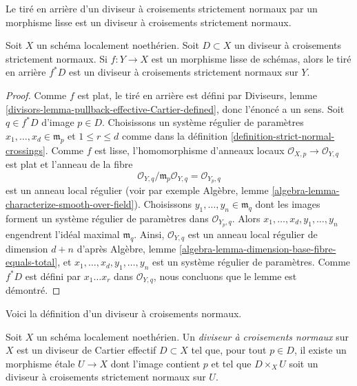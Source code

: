 \begin{lemma}
\label{lemma-smooth-pullback-strict-normal-crossings}
\begin{slogan}
Le tiré en arrière d'un diviseur à croisements strictement normaux par un morphisme
lisse est un diviseur à croisements strictement normaux.
\end{slogan}
Soit $X$ un schéma localement noethérien. Soit $D \subset X$ un
diviseur à croisements strictement normaux. Si $f : Y \to X$ est un morphisme
lisse de schémas, alors le tiré en arrière $f^*D$ est un
diviseur à croisements strictement normaux sur $Y$.
\end{lemma}

\begin{proof}
Comme $f$ est plat, le tiré en arrière est défini par
Diviseurs, lemme \ref{divisors-lemma-pullback-effective-Cartier-defined},
donc l'énoncé a un sens.
Soit $q \in f^*D$ d'image $p \in D$. Choisissons un système régulier
de paramètres $x_1, \ldots, x_d \in \mathfrak m_p$
et $1 \leq r \leq d$ comme dans la
définition \ref{definition-strict-normal-crossings}.
Comme $f$ est lisse, l'homomorphisme d'anneaux locaux
$\mathcal{O}_{X, p} \to \mathcal{O}_{Y, q}$ est plat
et l'anneau de la fibre
$$
\mathcal{O}_{Y, q}/\mathfrak m_p \mathcal{O}_{Y, q} =
\mathcal{O}_{Y_p, q}
$$
est un anneau local régulier (voir par exemple
Algèbre, lemme \ref{algebra-lemma-characterize-smooth-over-field}).
Choisissons $y_1, \ldots, y_n \in \mathfrak m_q$ dont les images forment un système
régulier de paramètres dans $\mathcal{O}_{Y_p, q}$.
Alors $x_1, \ldots, x_d, y_1, \ldots, y_n$ engendrent l'idéal
maximal $\mathfrak m_q$. Ainsi, $\mathcal{O}_{Y, q}$
est un anneau local régulier de dimension
$d + n$ d'après Algèbre, lemme \ref{algebra-lemma-dimension-base-fibre-equals-total},
et $x_1, \ldots, x_d, y_1, \ldots, y_n$
est un système régulier de paramètres. Comme $f^*D$ est défini
par $x_1 \ldots x_r$ dans $\mathcal{O}_{Y, q}$, nous concluons
que le lemme est démontré.
\end{proof}

\noindent
Voici la définition d'un diviseur à croisements normaux.

\begin{definition}
\label{definition-normal-crossings}
Soit $X$ un schéma localement noethérien. Un {\it diviseur à croisements normaux}
sur $X$ est un diviseur de Cartier effectif $D \subset X$ tel que, pour
tout $p \in D$, il existe un morphisme \'etale $U \to X$ dont l'image
contient $p$ et tel que $D \times_X U$ soit un
diviseur à croisements strictement normaux sur $U$.
\end{definition}

